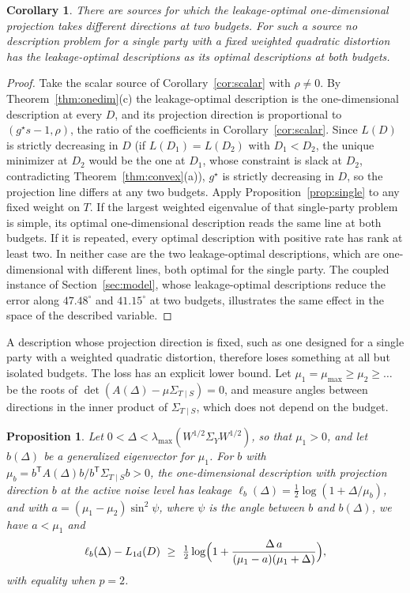 \documentclass[11pt,onecolumn]{IEEEtran}
\newtheorem{proposition}[theorem]{Proposition}
\newtheorem{corollary}[theorem]{Corollary}
\newcommand{\Kc}{\Sigma_{T\mid S}}
\begin{document}
\begin{corollary}\label{cor:nonred}
There are sources for which the leakage-optimal one-dimensional projection
takes different directions at two budgets. For such a source no
description problem for a single party with a fixed weighted quadratic
distortion has the leakage-optimal descriptions as its optimal
descriptions at both budgets.
\end{corollary}

\begin{proof}
Take the scalar source of Corollary~\ref{cor:scalar} with $\rho\ne0$. By
Theorem~\ref{thm:onedim}(c) the leakage-optimal description is the
one-dimensional description at every $D$, and its projection direction is
proportional to $(g^\star s-1,\rho)$, the ratio of the coefficients in
Corollary~\ref{cor:scalar}. Since $L(D)$ is strictly decreasing in $D$
(if $L(D_1)=L(D_2)$ with $D_1<D_2$, the unique minimizer at $D_2$ would be
the one at $D_1$, whose constraint is slack at $D_2$, contradicting
Theorem~\ref{thm:convex}(a)), $g^\star$ is strictly decreasing in $D$, so the
projection line differs at any two budgets. Apply
Proposition~\ref{prop:single} to any fixed weight on $T$. If the largest
weighted eigenvalue of that single-party problem is simple, its optimal
one-dimensional description reads the same line at both budgets. If it
is repeated, every optimal description with positive rate has rank at
least two. In neither case are the two leakage-optimal descriptions,
which are one-dimensional with different lines, both optimal for the
single party. The coupled
instance of Section~\ref{sec:model}, whose leakage-optimal
descriptions reduce the error along $47.48^\circ$ and $41.15^\circ$ at
two budgets, illustrates the same effect in the space of the described
variable.
\end{proof}

A description whose projection direction is fixed, such as one designed
for a single party with a weighted quadratic distortion, therefore loses
something at all but isolated budgets. The loss has an explicit lower
bound. Let $\mu_1=\mu_{\max}\ge\mu_2\ge\dots$ be the roots of
$\det(A(\Delta)-\mu\Kc)=0$, and measure angles between directions in the
inner product of $\Kc$, which does not depend on the budget.

\begin{proposition}\label{prop:fixedread}
Let $0<\Delta<\lambda_{\max}(W^{1/2}\Sigma_YW^{1/2})$, so that $\mu_1>0$,
and let $b(\Delta)$ be a generalized eigenvector for $\mu_1$. For $b$
with $\mu_b=b^{\mathsf T}A(\Delta)b/b^{\mathsf T}\Kc b>0$, the
one-dimensional description with projection direction $b$ at the active
noise level has leakage $\ell_b(\Delta)=\tfrac12\log(1+\Delta/\mu_b)$, and
with $a=(\mu_1-\mu_2)\sin^2\psi$, where $\psi$ is the angle between $b$ and
$b(\Delta)$, we have $a<\mu_1$ and
\begin{equation}
\ell_b(\Delta)-L_{\mathrm{1d}}(D)\ \ge\ \tfrac12\log\Bigl(1+\frac{\Delta\,a}{(\mu_1-a)(\mu_1+\Delta)}\Bigr),
\label{eq:fixedread}
\end{equation}
with equality when $p=2$.
\end{proposition}
\end{document}
